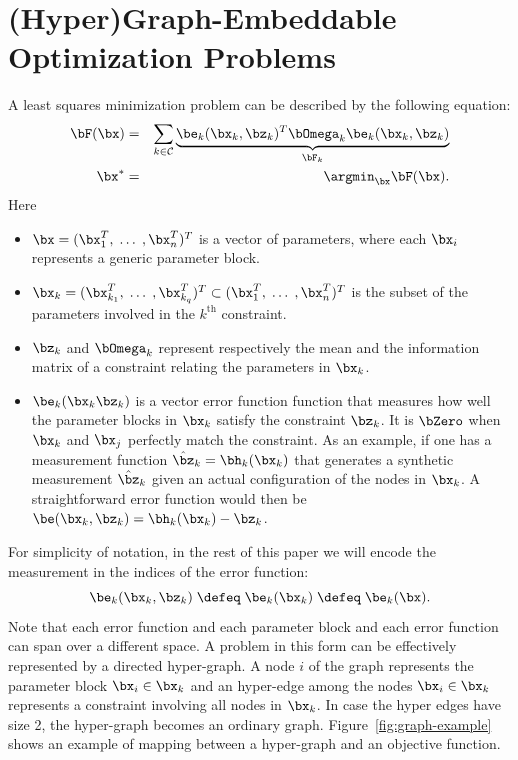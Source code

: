 \documentclass[a4paper]{article}
\begin{document}
\section{(Hyper)Graph-Embeddable Optimization Problems}
A least squares minimization problem can be described by the following equation:
\begin{eqnarray}
\bF(\bx)&=& \sum_{k \in\mathcal{C}}
\underbrace{\be_k(\bx_k, \bz_{k})^T \bOmega_{k} \be_k(\bx_k, \bz_{k})}_{\bF_{k}}
\label{eq:sumOfFactors}\\
\bx^*&=&\argmin_{\bx} \bF(\bx).
\label{eq:toMinimize}
\end{eqnarray}
Here
\begin{itemize}
  \item  $\bx=(\bx_1^T,\;\ldots\;,\bx_n^T)^T$ is a vector of
    parameters, where each $\bx_i$ represents a generic parameter block.
  \item $\bx_k=(\bx_{k_1}^T,\;\ldots\;,\bx_{k_q}^T)^T \subset
    (\bx_1^T,\;\ldots\;,\bx_n^T)^T$ is the subset of the parameters
    involved in the $k^\mathrm{th}$ constraint.  
  \item $\bz_{k}$ and $\bOmega_{k}$ represent 
    respectively the mean and the information matrix of a constraint
    relating the parameters in $\bx_k$.
  \item $\be_k(\bx_k \bz_{k})$ is a vector error function function
    that measures how well the parameter blocks in $\bx_k$ satisfy the
    constraint $\bz_{k}$. It is $\bZero$ when $\bx_k$ and $\bx_j$
    perfectly match the constraint.  As an example, if one has a
    measurement function $\hat \bz_k = \bh_k(\bx_k)$ that generates a
    synthetic measurement $\hat \bz_k$ given an actual configuration
    of the nodes in $\bx_k$.  A straightforward error function would
    then be $\be(\bx_k, \bz_{k}) = \bh_k(\bx_k) - \bz_k$.
\end{itemize}
For simplicity of notation, in the rest of this paper we will encode
the measurement in the indices of the error function:
\begin{equation}
\be_k(\bx_k, \bz_{k}) \; \defeq \; \be_{k}(\bx_k) \; \defeq \; \be_{k}(\bx).
\end{equation}
Note that each error function and each parameter block and each error
function can span over a different space.  A problem in this form can
be effectively represented by a directed hyper-graph. A node $i$ of
the graph represents the parameter block $\bx_i \in \bx_k$ and an
hyper-edge among the nodes $\bx_{i} \in \bx_k $ represents a
constraint involving all nodes in $\bx_k$. In case the hyper edges
have size 2, the hyper-graph becomes an ordinary graph.
Figure~\ref{fig:graph-example} shows an
example of mapping between a hyper-graph and an objective function.
\end{document}
